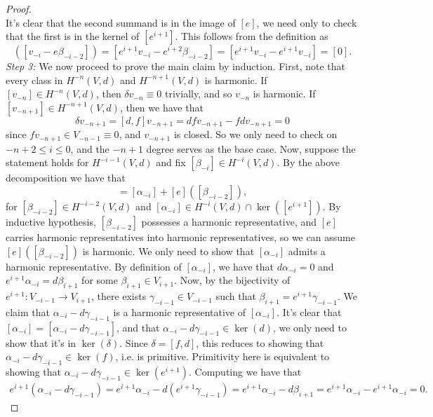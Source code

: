\documentclass{amsart}
\newcommand{\ra}{\rightarrow}
\theoremstyle{definition}
\begin{document}
\begin{proof}
\begin{equation*}
\end{equation*}
It's clear that the second summand is in the image of $[e]$, we need only to check that the first is in the kernel of $[e^{i+1}]$. This follows from the definition as 
\begin{equation*}
    [e^{i+1}]([v_{-i}-e\beta_{-i-2}]) = [e^{i+1}v_{-i}-e^{i+2}\beta_{-i-2}] = [e^{i+1}v_{-i} - e^{i+1}v_{-i}]=[0].
\end{equation*}
\newline
\textit{Step 3:}
We now proceed to prove the main claim by induction. First, note that every class in $H^{-n}(V,d)$ and $H^{-n+1}(V,d)$ is harmonic. If $[v_{-n}] \in H^{-n}(V,d)$, then $\delta v_{-n}\equiv 0$ trivially, and so $v_{-n}$ is harmonic. If $[v_{-n+1}] \in H^{-n+1}(V,d)$, then we have that
\begin{equation*}
    \delta v_{-n+1} = [d,f]v_{-n+1} = dfv_{-n+1} - fdv_{-n+1}=0
\end{equation*}
since $fv_{-n+1}\in V_{-n-1}\equiv 0$, and $v_{-n+1}$ is closed. So we only need to check on $-n+2 \leq i \leq 0$, and the $-n+1$ degree serves as the base case. Now, suppose the statement holds for $H^{-i-1}(V,d)$ and fix $[\beta_{-i}] \in H^{-i}(V,d)$. By the above decomposition we have that
\begin{equation*}
    [\beta_{-i}] = [\alpha_{-i}]+ [e]([\beta_{-i-2}]),
\end{equation*}
for $[\beta_{-i-2}]\in H^{-i-2}(V,d)$ and $[\alpha_{-i}] \in H^{-i}(V,d) \cap \ker([e^{i+1}])$. By inductive hypothesis, $[\beta_{-i-2}]$ possesses a harmonic representative, and $[e]$ carries harmonic representatives into harmonic representatives, so we can assume $[e]([\beta_{-i-2}])$ is harmonic. We only need to show that $[\alpha_{-i}]$ admits a harmonic representative. By definition of $[\alpha_{-i}]$, we have that $d\alpha_{-i}=0$ and $e^{i+1}\alpha_{-i}=d\beta_{i+1}$ for some $\beta_{i+1}\in V_{i+1}$. Now, by the bijectivity of $e^{i+1}:V_{-i-1}\ra V_{i+1}$, there exists $\gamma_{-i-1}\in V_{-i-1}$ such that $\beta_{i+1} = e^{i+1}\gamma_{-i-1}$. We claim that $\alpha_{-i}-d\gamma_{-i-1}$ is a harmonic representative of $[\alpha_{-i}]$. It's clear that $[\alpha_{-i}]=[\alpha_{-i}-d\gamma_{-i-1}]$, and that $\alpha_{-i}-d\gamma_{-i-1} \in \ker(d)$, we only need to show that it's in $\ker(\delta)$. Since $\delta=[f,d]$, this reduces to showing that $\alpha_{-i}-d\gamma_{-i-1} \in \ker(f)$, i.e. is primitive. Primitivity here is equivalent to showing that $\alpha_{-i}-d\gamma_{-i-1} \in \ker(e^{i+1})$. Computing we have that
\begin{align*}
    e^{i+1}(\alpha_{-i}-d\gamma_{-i-1}) = e^{i+1}\alpha_{-i} - d(e^{i+1}\gamma_{-i-1}) = e^{i+1}\alpha_{-i} - d\beta_{i+1} = e^{i+1}\alpha_{-i}-e^{i+1}\alpha_{-i}=0.
\end{align*}
\end{proof}
\end{document}
